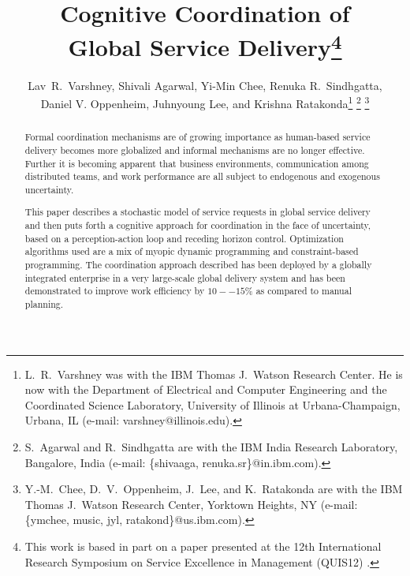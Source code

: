 \documentclass[10pt,journal,cspaper,compsoc]{IEEEtran}
\begin{document}
\title{Cognitive Coordination of \\Global Service Delivery\thanks{
  This work is based in part on a paper presented at the 12th International Research Symposium on Service Excellence in 
  Management (QUIS12) \cite{VarshneyO2011}.}
}

\author{Lav~R.~Varshney, Shivali Agarwal, Yi-Min Chee, Renuka R.~Sindhgatta, \\Daniel V. Oppenheim, Juhnyoung Lee, and Krishna Ratakonda\thanks{L.~R.~Varshney was with the IBM Thomas J.\ Watson Research Center.  He is now with the Department of Electrical and Computer Engineering and the Coordinated Science Laboratory, University of Illinois at Urbana-Champaign, Urbana, IL (e-mail: varshney@illinois.edu).}
\thanks{S.~Agarwal and R.~Sindhgatta are with the IBM India Research Laboratory, Bangalore, India (e-mail: \{shivaaga, renuka.sr\}@in.ibm.com).}
\thanks{Y.-M.~Chee, D.~V.~Oppenheim, J.~Lee, and K.~Ratakonda are with the IBM Thomas J.\ Watson Research Center, Yorktown Heights, NY (e-mail: \{ymchee, music, jyl, ratakond\}@us.ibm.com).}
}

\maketitle
\thispagestyle{empty}
\pagestyle{empty}

\begin{abstract}
Formal coordination mechanisms are of growing importance as human-based service delivery becomes more globalized and informal 
mechanisms are no longer effective. Further it is becoming apparent that business environments, communication 
among distributed teams, and work performance are all subject to endogenous and exogenous uncertainty.

This paper describes a stochastic model of service requests in global service delivery and then puts forth a cognitive
approach for coordination in the face of uncertainty, based on a perception-action loop and receding horizon control.
Optimization algorithms used are a mix of myopic dynamic programming and constraint-based programming.
The coordination approach described has been deployed by a globally integrated enterprise in a very large-scale 
global delivery system and has been demonstrated to improve work efficiency by $10--15$\% as compared to manual 
planning.
\end{abstract}
\end{document}
